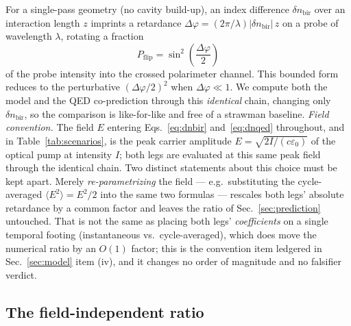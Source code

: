 \documentclass[aps,prd,twocolumn,superscriptaddress,nofootinbib,longbibliography]{revtex4-2}
\newcommand{\dnbir}{\delta n_{\mathrm{bir}}}
\newcommand{\Pflip}{P_{\mathrm{flip}}}
\begin{document}
For a single-pass geometry (no cavity build-up), an index difference $\dnbir$
over an interaction length $z$ imprints a retardance
$\Delta\varphi=(2\pi/\lambda)|\dnbir|\,z$ on a probe of wavelength $\lambda$,
rotating a fraction
%
\begin{equation}
  \Pflip=\sin^2\!\left(\frac{\Delta\varphi}{2}\right)
  \label{eq:flip}
\end{equation}
%
of the probe intensity into the crossed polarimeter channel. This bounded form
reduces to the perturbative $(\Delta\varphi/2)^2$ when $\Delta\varphi\ll1$. We
compute both the model and the QED co-prediction through this \emph{identical}
chain, changing only $\dnbir$, so the comparison is like-for-like and free of a
strawman baseline. \emph{Field convention.} The field $E$ entering
Eqs.~\eqref{eq:dnbir} and~\eqref{eq:dnqed} throughout, and in
Table~\ref{tab:scenarios}, is the peak carrier amplitude
$E=\sqrt{2I/(c\varepsilon_0)}$ of the optical pump at intensity $I$; both legs are
evaluated at this same peak field through the identical chain. Two distinct
statements about this choice must be kept apart. Merely \emph{re-parametrizing}
the field --- e.g.\ substituting the cycle-averaged $\langle E^2\rangle=E^2/2$ into
the same two formulas --- rescales both legs' absolute retardance by a common
factor and leaves the ratio of Sec.~\ref{sec:prediction} untouched. That is not
the same as placing both legs' \emph{coefficients} on a single temporal footing
(instantaneous vs.\ cycle-averaged), which does move the numerical ratio by an
$O(1)$ factor; this is the convention item ledgered in Sec.~\ref{sec:model} item
(iv), and it changes no order of magnitude and no falsifier verdict.

\subsection{The field-independent ratio}
\end{document}
